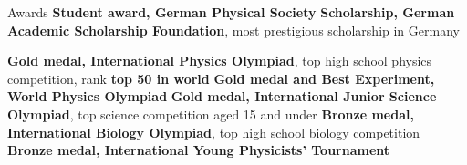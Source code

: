 \begin{rubric}{Awards}
\entry*[2012\hfill] \textbf{Student award, German Physical Society}
\entry*[2009\hfill] \textbf{Scholarship, German Academic Scholarship Foundation}, most prestigious scholarship in Germany

\entry*[2009      ] \textbf{Gold medal, International Physics Olympiad}, top high school physics competition, rank \textbf{top 50 in world}
\entry*[2011\hfill] \textbf{Gold medal and Best Experiment, World Physics Olympiad}
\entry*[2007-2008\hfill] \textbf{Gold medal, International Junior Science Olympiad}, top science competition aged 15 and under
\entry*[2010\hfill] \textbf{Bronze medal, International Biology Olympiad}, top high school biology competition
\entry*[2009\hfill] \textbf{Bronze medal, International Young Physicists' Tournament}

\end{rubric}

